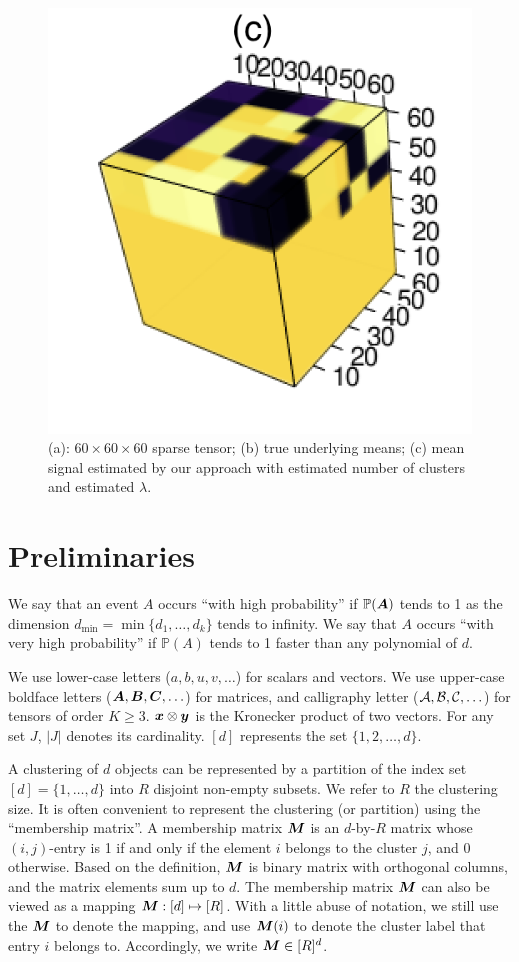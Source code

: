 \documentclass{article}
\begin{document}
\begin{figure}
	\includegraphics[scale=0.5]{figures/figure2/output.png}
	\caption{(a): $60\times 60\times 60$ sparse tensor; (b) true underlying means; (c) mean signal estimated by our approach with estimated number of clusters and estimated $\lambda$.}
	\label{fig2}
\end{figure}


\section{Preliminaries}

We say that an event $A$ occurs ``with high probability'' if $\mathbb{P}(\bm A)$ tends to 1 as the dimension $d_{\min}=\min\{d_1,\ldots,d_k\}$ tends to infinity. We say that $A$ occurs ``with very high probability'' if $\mathbb{P}(A)$ tends to 1 faster than any polynomial of $d$. 


We use lower-case letters ($a,b,u,v,\ldots$) for scalars and vectors. We use upper-case boldface letters ($\bm A,\bm B,\bm C,\ldots$) for matrices, and calligraphy letter ($\mathcal{A}, \mathcal{B}, \mathcal{C},\ldots$) for tensors of order $K\geq 3$. $\bm x\otimes \bm{y}$ is the Kronecker product of two vectors. For any set $J$, $|J|$ denotes its cardinality. $[d]$ represents the set $\{1,2,\ldots,d\}$. 

A clustering of $d$ objects can be represented by a partition of the index set $[d]=\{1,\ldots,d\}$ into $R$ disjoint non-empty subsets. We refer to $R$ the clustering size. It is often convenient to represent the clustering (or partition) using the ``membership matrix''. A membership matrix $\bm M$ is an $d$-by-$R$ matrix whose $(i,j)$-entry is 1 if and only if the element $i$ belongs to the cluster $j$, and 0 otherwise. Based on the definition, $\bm M$ is binary matrix with orthogonal columns, and the matrix elements sum up to $d$. The membership matrix $\bm M$ can also be viewed as a mapping $\bm M:[d]\mapsto[R]$. With a little abuse of notation, we still use the $\bm M$ to denote the mapping, and use $\bm M(i)$ to denote the cluster label that entry $i$ belongs to. Accordingly, we write $\bm M\in[R]^d$. 
\end{document}
